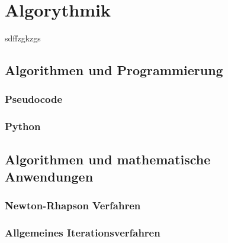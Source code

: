 \chapter{Algorythmik}
sdffzgkzgs\\

	\section{Algorithmen und Programmierung}

		\subsection{Pseudocode}

		\subsection{Python}

	\section{Algorithmen und mathematische Anwendungen}

		\subsection{Newton-Rhapson Verfahren}

		\subsection{Allgemeines Iterationsverfahren}

